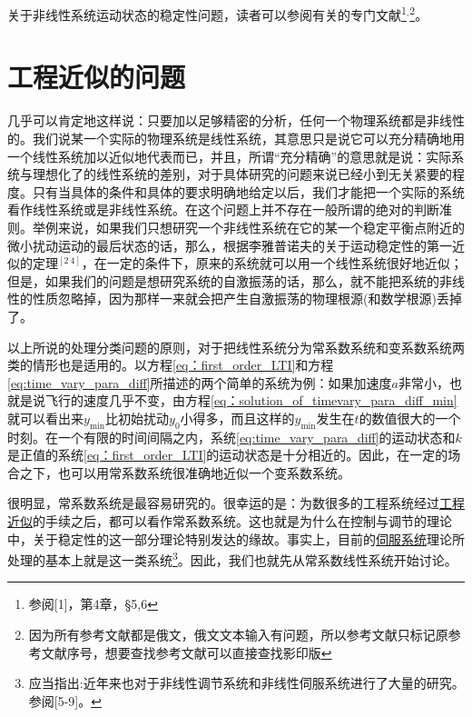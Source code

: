 关于非线性系统运动状态的稳定性问题，读者可以参阅有关的专门文献\footnote{参阅[1]，第4章，\S 5,6}$^,$\footnote{因为所有参考文献都是俄文，俄文文本输入有问题，所以参考文献只标记原参考文献序号，想要查找参考文献可以直接查找影印版}。

\section{工程近似的问题}

几乎可以肯定地这样说：只要加以足够精密的分析，任何一个物理系统都是非线性的。我们说某一个实际的物理系统是线性系统，其意思只是说它可以充分精确地用一个线性系统加以近似地代表而已，并且，所谓“充分精确”的意思就是说：实际系统与理想化了的线性系统的差别，对于具体研究的问题来说已经小到无关紧要的程度。只有当具体的条件和具体的要求明确地给定以后，我们才能把一个实际的系统看作线性系统或是非线性系统。在这个问题上并不存在一般所谓的绝对的判断准则。举例来说，如果我们只想研究一个非线性系统在它的某一个稳定平衡点附近的微小扰动运动的最后状态的话，那么，根据李雅普诺夫的关于运动稳定性的第一近似的定理$^{[2~4]}$，在一定的条件下，原来的系统就可以用一个线性系统很好地近似；但是，如果我们的问题是想研究系统的自激振荡的话，那么，就不能把系统的非线性的性质忽略掉，因为那样一来就会把产生自激振荡的物理根源(和数学根源)丢掉了。

以上所说的处理分类问题的原则，对于把线性系统分为常系数系统和变系数系统两类的情形也是适用的。以方程\eqref{eq：first_order_LTI}和方程\eqref{eq:time_vary_para_diff}所描述的两个简单的系统为例：如果加速度$a$非常小，也就是说飞行的速度几乎不变，由方程\eqref{eq：solution_of_timevary_para_diff_min}就可以看出来$y_{\min}$比初始扰动$y_0$小得多，而且这样的$y_{\min}$发生在$t$的数值很大的一个时刻。在一个有限的时间间隔之内，系统\eqref{eq:time_vary_para_diff}的运动状态和$k$是正值的系统\eqref{eq：first_order_LTI}的运动状态是十分相近的。因此，在一定的场合之下，也可以用常系数系统很准确地近似一个变系数系统。

很明显，常系数系统是最容易研究的。很幸运的是：为数很多的工程系统经过\underline{工程近似}的手续之后，都可以看作常系数系统。这也就是为什么在控制与调节的理论中，关于稳定性的这一部分理论特别发达的缘故。事实上，目前的\underline{伺服系统}理论所处理的基本上就是这一类系统\footnote{应当指出:近年来也对于非线性调节系统和非线性伺服系统进行了大量的研究。参阅[5-9]。}。因此，我们也就先从常系数线性系统开始讨论。